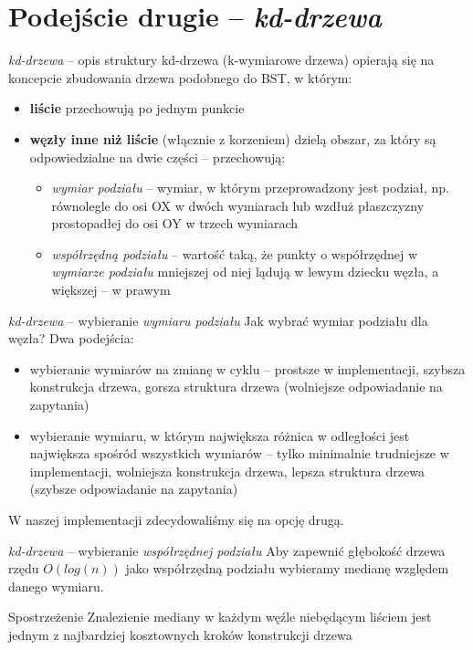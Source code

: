 \documentclass{beamer}
\begin{document}
\section{Podejście drugie -- \textit{kd-drzewa}}

\begin{frame}{\textit{kd-drzewa} -- opis struktury}
    kd-drzewa (k-wymiarowe drzewa) opierają się na koncepcie zbudowania drzewa podobnego do BST, w którym:
    \begin{itemize}
        \item<2-> \textbf{liście} przechowują po jednym punkcie
        \item<3-> \textbf{węzły inne niż liście} (włącznie z korzeniem) dzielą obszar, za który są odpowiedzialne na dwie części -- przechowują:
        \begin{itemize}
            \item<4-> \textit{wymiar podziału} -- wymiar, w którym przeprowadzony jest podział, np. równolegle do osi OX w dwóch wymiarach lub wzdłuż płaszczyzny prostopadłej do osi OY w trzech wymiarach
            \item<5-> \textit{współrzędną podziału} -- wartość taką, że punkty o współrzędnej w \textit{wymiarze podziału} mniejszej od niej lądują w lewym dziecku węzła, a większej -- w prawym
        \end{itemize}
    \end{itemize}
\end{frame}

\begin{frame}{\textit{kd-drzewa} -- wybieranie \textit{wymiaru podziału}}
    Jak wybrać wymiar podziału dla węzła?
    Dwa podejścia:
    \begin{itemize}
        \item<2-> wybieranie wymiarów na zmianę w cyklu -- prostsze w implementacji, szybsza konstrukcja drzewa, gorsza struktura drzewa (wolniejsze odpowiadanie na zapytania)
        \item<3-> wybieranie wymiaru, w którym największa różnica w odległości jest największa spośród wszystkich wymiarów -- tylko minimalnie trudniejsze w implementacji, wolniejsza konstrukcja drzewa, lepsza struktura drzewa (szybsze odpowiadanie na zapytania)
    \end{itemize}
    \pause
    W naszej implementacji zdecydowaliśmy się na opcję drugą.
\end{frame}

\begin{frame}{\textit{kd-drzewa} -- wybieranie \textit{współrzędnej podziału}}
    Aby zapewnić głębokość drzewa rzędu $O(log(n))$ jako współrzędną podziału wybieramy medianę względem danego wymiaru.\\
    \pause
    \begin{block}{Spostrzeżenie}
        Znalezienie mediany w każdym węźle niebędącym liściem jest jednym z najbardziej kosztownych kroków konstrukcji drzewa
    \end{block}
\end{frame}
\end{document}
